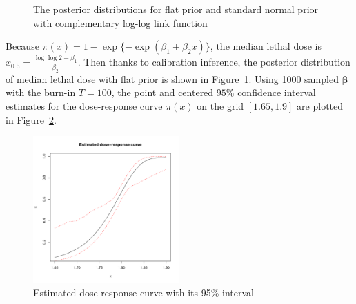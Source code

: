 \documentclass[]{article}
\begin{document}
\begin{enumerate}
{\begin{itemize}
\begin{figure}[ht!]
\begin{subfigure}{0.45\textwidth}
        		\end{subfigure}
        		\caption{The posterior distributions for flat prior and standard normal prior with complementary log-log link function}
        		\label{6}
        	\end{figure}
        	Because $\pi(x) = 1-\exp\{-\exp(\beta_1+\beta_2x)\}$, the median lethal dose is $x_{0.5} = \frac{\log\log 2-\beta_1}{\beta_2}$. Then thanks to calibration inference, the posterior distribution of median lethal dose with flat prior is shown in Figure~\ref{6}. Using 1000 sampled $\bm{\beta}$ with the burn-in $T = 100$, the point and centered $95\%$ confidence interval estimates for the dose-response curve $\pi(x)$ on the grid $[1.65,1.9]$ are plotted in Figure~\ref{7}.
        	\begin{figure}[ht!]
        		\centering
        		\includegraphics[width = 0.5\textwidth]{pic/HW3_2/a3.pdf}
        		\caption{Estimated dose-response curve with its 95\% interval}
        		\label{7}
        	\end{figure}
        	

\end{itemize}}
\end{enumerate}
\end{document}
